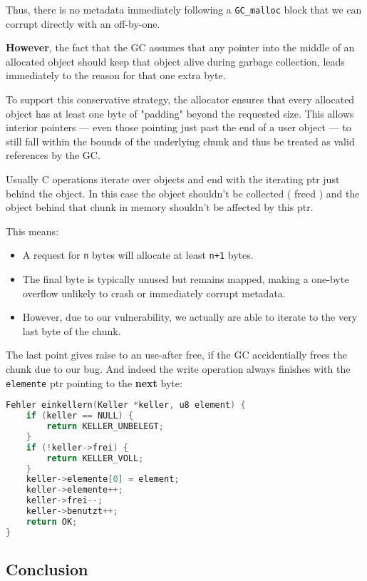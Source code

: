 \documentclass[a4paper,11pt]{article}
\begin{document}
Thus, there is no metadata immediately following a \texttt{GC\_malloc} block that we can corrupt directly with an off-by-one.

\vspace{1em}
\textbf{However}, the fact that the GC assumes that any pointer into the middle of an allocated object should keep that object alive during garbage collection, leads immediately to the reason for that one extra byte.

To support this conservative strategy, the allocator ensures that every allocated object has at least one byte of "padding" beyond the requested size. This allows interior pointers — even those pointing just past the end of a user object — to still fall within the bounds of the underlying chunk and thus be treated as valid references by the GC.

Usually C operations iterate over objects and end with the iterating ptr just behind the object. In this case the object shouldn't be collected ( freed ) and the object behind that chunk in memory shouldn't be affected by this ptr.

This means:
\begin{itemize}
    \item A request for \texttt{n} bytes will allocate at least \texttt{n+1} bytes.
    \item The final byte is typically unused but remains mapped, making a one-byte overflow unlikely to crash or immediately corrupt metadata.
    \item However, due to our vulnerability, we actually are able to iterate to the very last byte of the chunk.
\end{itemize}

The last point gives raise to an use-after free, if the GC accidentially frees the chunk due to our bug. And indeed the write operation always finishes with the \texttt{elemente} ptr pointing to the \textbf{next} byte:
\begin{lstlisting}[language=C]
Fehler einkellern(Keller *keller, u8 element) {
    if (keller == NULL) {
        return KELLER_UNBELEGT;
    }
    if (!keller->frei) {
        return KELLER_VOLL;
    }
    keller->elemente[0] = element;
    keller->elemente++;
    keller->frei--;
    keller->benutzt++;
    return OK;
}
\end{lstlisting}



\subsection*{Conclusion}
\end{document}
